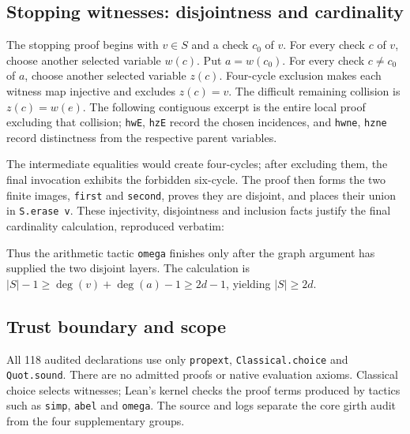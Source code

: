 \documentclass[11pt]{article}
\theoremstyle{definition}
\theoremstyle{remark}
\begin{document}
\subsection{Stopping witnesses: disjointness and cardinality}\label{sec:lean-stopping}

The stopping proof begins with $v\in S$ and a check $c_0$ of $v$.
For every check $c$ of $v$, choose another selected variable $w(c)$.
Put $a=w(c_0)$. For every check $c\ne c_0$ of $a$, choose another selected
variable $z(c)$. Four-cycle exclusion makes each witness map injective
and excludes $z(c)=v$. The difficult remaining collision is
$z(c)=w(e)$. The following contiguous excerpt is the entire local proof
excluding that collision; \texttt{hwE}, \texttt{hzE} record the chosen
incidences, and \texttt{hwne}, \texttt{hzne} record distinctness from the
respective parent variables.
\par\medskip\noindent\begin{minipage}{\linewidth}

\end{minipage}\par\medskip
The intermediate equalities would create four-cycles; after excluding
them, the final invocation exhibits the forbidden six-cycle. The proof
then forms the two finite images, \texttt{first} and \texttt{second},
proves they are disjoint, and places their union in
\texttt{S.erase v}. These injectivity, disjointness and inclusion facts
justify the final cardinality calculation, reproduced verbatim:
\par\medskip\noindent\begin{minipage}{\linewidth}

\end{minipage}\par\medskip
Thus the arithmetic tactic \texttt{omega} finishes only after the graph
argument has supplied the two disjoint layers. The calculation is
$|S|-1\ge\deg(v)+\deg(a)-1\ge2d-1$, yielding $|S|\ge2d$.

\subsection{Trust boundary and scope}

All 118 audited declarations use only \texttt{propext},
\texttt{Classical.choice} and \texttt{Quot.sound}. There are no admitted
proofs or native evaluation axioms. Classical choice selects witnesses;
Lean's kernel checks the proof terms produced by tactics such as
\texttt{simp}, \texttt{abel} and \texttt{omega}. The source and logs
separate the core girth audit from the four supplementary groups.
\end{document}
